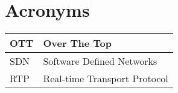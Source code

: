 \cleardoublepage
{}
\chapter*{Acronyms}

\begin{table*}[htb]
\centering
\begin{tabular}{p{} p{}}
\hline
OTT & Over The Top \\
\hline
SDN & Software Defined Networks \\
\hline
RTP & Real-time Transport Protocol \\
\hline
\end{tabular}
\end{table*}


